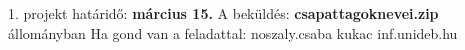 1. projekt határidő: {\bf március 15.}\newline
A beküldés: {\bf csapattagoknevei.zip} állományban\newline
Ha gond van a feladattal:
noszaly.csaba kukac inf.unideb.hu
